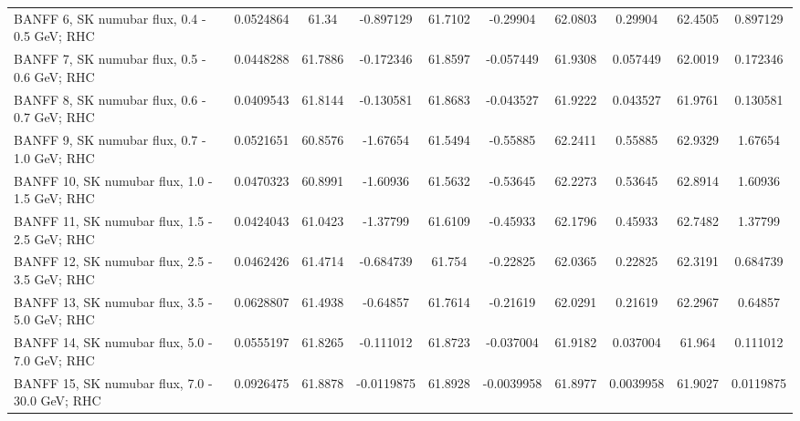 \begin{tabular}{| l | S | S  S | S  S | S  S | S  S | }
                                   BANFF  6, SK numubar flux, 0.4 - 0.5 GeV; RHC &       0.0524864 &           61.34 &       -0.897129 &         61.7102 &        -0.29904 &         62.0803 &         0.29904 &         62.4505 &        0.897129 \\ 
                                   BANFF  7, SK numubar flux, 0.5 - 0.6 GeV; RHC &       0.0448288 &         61.7886 &       -0.172346 &         61.8597 &       -0.057449 &         61.9308 &        0.057449 &         62.0019 &        0.172346 \\ 
                                   BANFF  8, SK numubar flux, 0.6 - 0.7 GeV; RHC &       0.0409543 &         61.8144 &       -0.130581 &         61.8683 &       -0.043527 &         61.9222 &        0.043527 &         61.9761 &        0.130581 \\ 
                                   BANFF  9, SK numubar flux, 0.7 - 1.0 GeV; RHC &       0.0521651 &         60.8576 &        -1.67654 &         61.5494 &        -0.55885 &         62.2411 &         0.55885 &         62.9329 &         1.67654 \\ 
                                   BANFF 10, SK numubar flux, 1.0 - 1.5 GeV; RHC &       0.0470323 &         60.8991 &        -1.60936 &         61.5632 &        -0.53645 &         62.2273 &         0.53645 &         62.8914 &         1.60936 \\ 
                                   BANFF 11, SK numubar flux, 1.5 - 2.5 GeV; RHC &       0.0424043 &         61.0423 &        -1.37799 &         61.6109 &        -0.45933 &         62.1796 &         0.45933 &         62.7482 &         1.37799 \\ 
                                   BANFF 12, SK numubar flux, 2.5 - 3.5 GeV; RHC &       0.0462426 &         61.4714 &       -0.684739 &          61.754 &        -0.22825 &         62.0365 &         0.22825 &         62.3191 &        0.684739 \\ 
                                   BANFF 13, SK numubar flux, 3.5 - 5.0 GeV; RHC &       0.0628807 &         61.4938 &        -0.64857 &         61.7614 &        -0.21619 &         62.0291 &         0.21619 &         62.2967 &         0.64857 \\ 
                                   BANFF 14, SK numubar flux, 5.0 - 7.0 GeV; RHC &       0.0555197 &         61.8265 &       -0.111012 &         61.8723 &       -0.037004 &         61.9182 &        0.037004 &          61.964 &        0.111012 \\ 
                                  BANFF 15, SK numubar flux, 7.0 - 30.0 GeV; RHC &       0.0926475 &         61.8878 &      -0.0119875 &         61.8928 &      -0.0039958 &         61.8977 &       0.0039958 &         61.9027 &       0.0119875 \\ 

\end{tabular}
